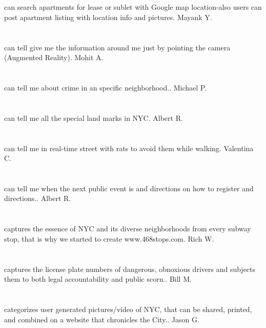 \section{}can search apartments for lease or sublet with Google map location-also users can post apartment listing with location info and pictures. Mayank Y.
\section{}can tell give me the information around me just by pointing the camera (Augmented Reality). Mohit A.
\section{}can tell me about crime in an specific neighborhood.. Michael P.
\section{}can tell me all the special land marks in NYC. Albert R.
\section{}can tell me in real-time street with rats to avoid them while walking. Valentina C.
\section{}can tell me when the next public event is and directions on how to register and directions.. Albert R.
\section{}captures the essence of NYC and its diverse neighborhoods from every subway stop,  that is why we started to create  www.468stops.com. Rich W.
\section{}captures the license plate numbers of dangerous,  obnoxious drivers and subjects them to both legal accountability and public scorn.. Bill M.
\section{}categorizes user generated pictures/video of NYC,  that can be shared,  printed,  and combined on a website that chronicles the City.. Jason G.
